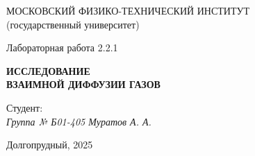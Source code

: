 \thispagestyle{empty}

\begin{center}
    МОСКОВСКИЙ ФИЗИКО-ТЕХНИЧЕСКИЙ ИНСТИТУТ \\
    (государственный университет)
\end{center}

\vfill

\begin{center}
    Лабораторная работа 2.2.1 \\ 
    \vspace{20pt}
    
    \textbf{ИССЛЕДОВАНИЕ} \\
    \textbf{ВЗАИМНОЙ ДИФФУЗИИ ГАЗОВ}
\end{center}  

\vfill

    \noindent Студент: \\
    \textit{Группа № Б01-405 \hfill Муратов А. А.}

\vfill

\begin{center}
    Долгопрудный, 2025
\end{center}